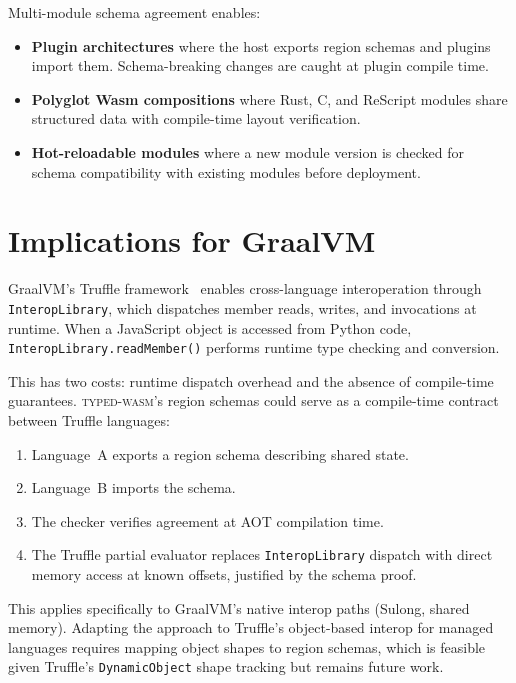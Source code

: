 \documentclass[11pt,a4paper]{article}
\newcommand{\typedwasm}{\textsc{typed-wasm}}
\begin{document}
Multi-module schema agreement enables:

\begin{itemize}
  \item \textbf{Plugin architectures} where the host exports region
    schemas and plugins import them.  Schema-breaking changes are caught
    at plugin compile time.

  \item \textbf{Polyglot Wasm compositions} where Rust, C, and ReScript
    modules share structured data with compile-time layout verification.

  \item \textbf{Hot-reloadable modules} where a new module version is
    checked for schema compatibility with existing modules before
    deployment.
\end{itemize}

\section{Implications for GraalVM}
\label{sec:graalvm}

GraalVM's Truffle framework~\cite{wurthinger2017} enables cross-language
interoperation through \lstinline{InteropLibrary}, which dispatches
member reads, writes, and invocations at runtime.  When a JavaScript
object is accessed from Python code, \lstinline{InteropLibrary.readMember()}
performs runtime type checking and conversion.

This has two costs: runtime dispatch overhead and the absence of
compile-time guarantees.  \typedwasm{}'s region schemas could serve as a
compile-time contract between Truffle languages:

\begin{enumerate}
  \item Language~A exports a region schema describing shared state.
  \item Language~B imports the schema.
  \item The checker verifies agreement at AOT compilation time.
  \item The Truffle partial evaluator replaces \lstinline{InteropLibrary}
    dispatch with direct memory access at known offsets, justified by the
    schema proof.
\end{enumerate}

This applies specifically to GraalVM's native interop paths (Sulong,
shared memory).  Adapting the approach to Truffle's object-based interop
for managed languages requires mapping object shapes to region schemas,
which is feasible given Truffle's \lstinline{DynamicObject} shape
tracking but remains future work.
\end{document}
